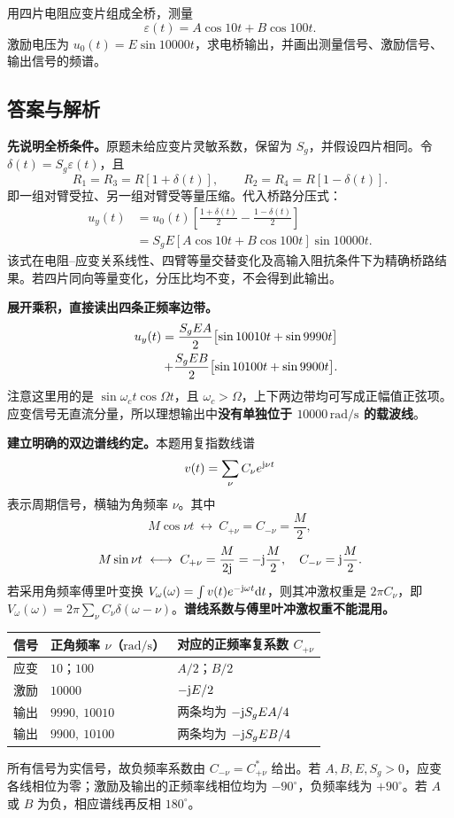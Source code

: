 \begin{hwquestion}
用四片电阻应变片组成全桥，测量
\[
\varepsilon(t)=A\cos10t+B\cos100t.
\]
激励电压为 $u_0(t)=E\sin10000t$，求电桥输出，并画出测量信号、激励信号、输出信号的频谱。
\end{hwquestion}

\subsection*{答案与解析}
\textbf{先说明全桥条件。}原题未给应变片灵敏系数，保留为 $S_g$，并假设四片相同。令 $\delta(t)=S_g\varepsilon(t)$，且
\[
R_1=R_3=R[1+\delta(t)],\qquad
R_2=R_4=R[1-\delta(t)].
\]
即一组对臂受拉、另一组对臂受等量压缩。代入桥路分压式：
\begin{align*}
u_y(t)&=u_0(t)\left[\frac{1+\delta(t)}2-\frac{1-\delta(t)}2\right]\\
&=\boxed{S_gE[A\cos10t+B\cos100t]\sin10000t}.
\end{align*}
该式在电阻--应变关系线性、四臂等量交替变化及高输入阻抗条件下为精确桥路结果。若四片同向等量变化，分压比均不变，不会得到此输出。

\textbf{展开乘积，直接读出四条正频率边带。}
\begin{align*}
u_y(t)=\frac{S_gEA}{2}\bigl[\sin10010t+\sin9990t\bigr]\\
\hspace{1.2cm}+\frac{S_gEB}{2}\bigl[\sin10100t+\sin9900t\bigr].
\end{align*}
注意这里用的是 $\sin\omega_ct\cos\Omega t$，且 $\omega_c>\Omega$，上下两边带均可写成正幅值正弦项。应变信号无直流分量，所以理想输出中\textbf{没有单独位于 $10000\,\mathrm{rad/s}$ 的载波线}。

\textbf{建立明确的双边谱线约定。}本题用复指数线谱
\[
v(t)=\sum_{\nu}C_{\nu}e^{\mathrm{j}\nu t}
\]
表示周期信号，横轴为角频率 $\nu$。其中
\[
M\cos\nu t\ \longleftrightarrow\ C_{+\nu}=C_{-\nu}=\frac M2,
\]
\[
M\sin\nu t\ \longleftrightarrow\ C_{+\nu}=\frac{M}{2\iu}=-\iu\frac M2,
\quad C_{-\nu}=\iu\frac M2.
\]
若采用角频率傅里叶变换 $V_\omega(\omega)=\int v(t)e^{-\mathrm{j}\omega t}\mathrm{d} t$，则其冲激权重是 $2\pi C_\nu$，即
$V_\omega(\omega)=2\pi\sum_\nu C_\nu\delta(\omega-\nu)$。\textbf{谱线系数与傅里叶冲激权重不能混用。}

\begin{table}[H]
\centering\small
\begin{tabularx}{\linewidth}{@{}p{1.25cm} p{3.7cm} X@{}}
\toprule
信号 & 正角频率 $\nu$（$\mathrm{rad/s}$） & 对应的正频率复系数 $C_{+\nu}$ \\
\midrule
应变 & $10$；$100$ & $A/2$；$B/2$ \\
激励 & $10000$ & $-\mathrm{j} E/2$ \\
输出 & $9990,\ 10010$ & 两条均为 $-\mathrm{j} S_gEA/4$ \\
输出 & $9900,\ 10100$ & 两条均为 $-\mathrm{j} S_gEB/4$ \\
\bottomrule
\end{tabularx}
\end{table}
所有信号为实信号，故负频率系数由 $C_{-\nu}=C_{+\nu}^{*}$ 给出。若 $A,B,E,S_g>0$，应变各线相位为零；激励及输出的正频率线相位均为 $-90^\circ$，负频率线为 $+90^\circ$。若 $A$ 或 $B$ 为负，相应谱线再反相 $180^\circ$。

